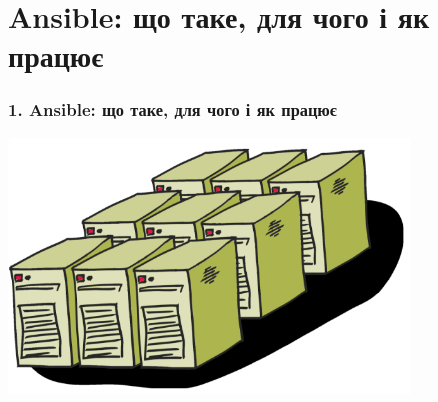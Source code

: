 \documentclass[pdf, 8pt, unicode, t]{beamer} %
\newcommand\Switchsubsection{0}
\begin{document}
\section{Ansible: що таке, для чого і як працює}
\renewcommand\Switchsubsection{0}
\begin{frame}[c]
\frametitle{1. Ansible: що таке, для чого і як працює}
\begin{center}
{\includegraphics[width=0.8\textwidth]{./images/pcs.png}}
\end{center}
\end{frame}
\end{document}
